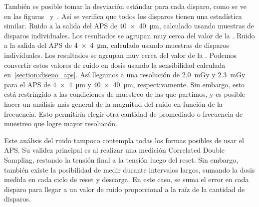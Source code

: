 También es posible tomar la desviación estándar para cada disparo,
como se ve en las figuras~ y~.
Así se verifica que todos los disparos tienen una estadística similar.
{Ruido a la salida del APS de \SI{40x40}{\micro\meter},
calculado usando muestras de disparos individuales.
Los resultados se agrupan muy cerca del valor de la .}
{Ruido a la salida del APS de \SI{4x4}{\micro\meter},
calculado usando muestras de disparos individuales.
Los resultados se agrupan muy cerca del valor de la .}
Podemos convertir estos valores de ruido en dosis usando la sensibilidad
calculada en~\ref{section:diseno_aps}.
Así llegamos a una resolución de \SI{2.0}{\milli\gray} y \SI{2.3}{\milli\gray}
para el APS de \SI{4x4}{\micro\meter} y \SI{40x40}{\micro\meter},
    respectivamente.
Sin embargo, esto está restringido a 
las condiciones de muestreo de las que partimos,
y es posible hacer un análisis más general de 
la magnitud del ruido en función de la frecuencia.
Esto permitiría elegir otra cantidad de promediado o frecuencia de muestreo 
que logre mayor resolución.

Este análisis del ruido tampoco contempla todas los formas posibles
de usar el APS.
Su validez principal es al realizar una medición Correlated Double Sampling,
restando la tensión final a la tensión luego del reset.
Sin embargo,
también existe la posibilidad de medir durante intervalos largos,
sumando la dosis medida en cada ciclo de reset y descarga.
En este caso, se suma el error en cada disparo para llegar a un valor de ruido
proporcional a la raíz de la cantidad de disparos.
%
